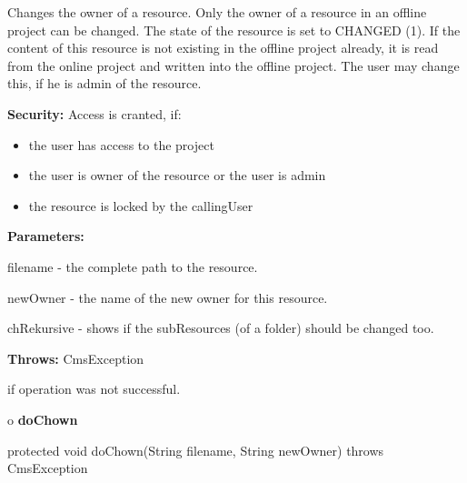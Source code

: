 \begin{description}
\htmlDD Changes the owner of a resource. \htmlBR
Only the owner of a resource in an offline project can be changed. The state
of the resource is set to CHANGED (1). If the content of this resource is not
existing in the offline project already, it is read from the online project
and written into the offline project. The user may change this, if he is admin
of the resource.

{\bf Security:} Access is cranted, if:

\begin{itemize}
\item the user has access to the project
\item the user is owner of the resource or the user is admin
\item the resource is locked by the callingUser
\end{itemize}

\begin{description}
\item {\bf Parameters:}

filename - the complete path to the resource.

newOwner - the name of the new owner for this resource.

chRekursive - shows if the subResources (of a folder) should be changed too.
\item {\bf Throws:} CmsException

if operation was not successful.
\end{description}

\end{description}

o {\bf doChown}

\begin{PRE}
 protected void doChown(String filename,
                        String newOwner) throws CmsException
\end{PRE}

